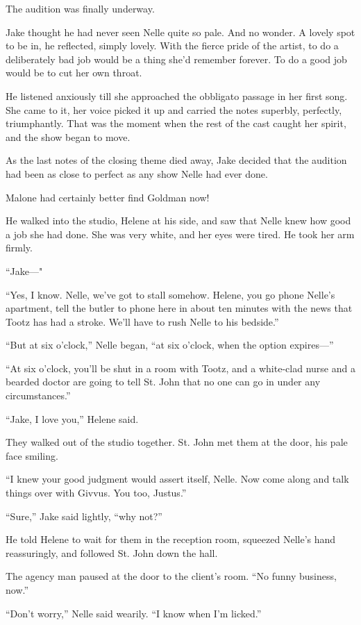 \documentclass{novel}
\begin{document}
The audition was finally underway.

Jake thought he had never seen Nelle quite so pale. And no wonder. A lovely spot to be in, he reflected, simply lovely. With the fierce pride of the artist, to do a deliberately bad job would be a thing she’d remember forever. To do a good job would be to cut her own throat.

He listened anxiously till she approached the obbligato passage in her first song. She came to it, her voice picked it up and carried the notes superbly, perfectly, triumphantly. That was the moment when the rest of the cast caught her spirit, and the show began to move.

As the last notes of the closing theme died away, Jake decided that the audition had been as close to perfect as any show Nelle had ever done.

Malone had certainly better find Goldman now!

He walked into the studio, Helene at his side, and saw that Nelle knew how good a job she had done. She was very white, and her eyes were tired. He took her arm firmly.

“Jake—"

“Yes, I know. Nelle, we’ve got to stall somehow. Helene, you go phone Nelle’s apartment, tell the butler to phone here in about ten minutes with the news that Tootz has had a stroke. We’ll have to rush Nelle to his bedside.”

“But at six o’clock,” Nelle began, “at six o’clock, when the option expires—”

“At six o’clock, you’ll be shut in a room with Tootz, and a white-clad nurse and a bearded doctor are going to tell St. John that no one can go in under any circumstances.”

“Jake, I love you,” Helene said.

They walked out of the studio together. St. John met them at the door, his pale face smiling.

“I knew your good judgment would assert itself, Nelle. Now come along and talk things over with Givvus. You too, Justus.”

“Sure,” Jake said lightly, “why not?”

He told Helene to wait for them in the reception room, squeezed Nelle’s hand reassuringly, and followed St. John down the hall.

The agency man paused at the door to the client’s room. “No funny business, now.”

“Don’t worry,” Nelle said wearily. “I know when I’m licked.”
\end{document}

